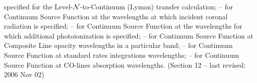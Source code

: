 specified for the Level-${\cal N}$-to-Continuum (Lyman) transfer calculation;
\blankline
{} -- for Continuum Source Function at the wavelengths 
at which incident coronal radiation is specified;
\blankline
{} -- for Continuum Source Function at the wavelengths
for which additional photoionization is specified;
\blankline
{} -- for Continuum Source Function at Composite Line
opacity wavelengths in a particular band;
\blankline
{} -- for Continuum Source Function at standard rates
integrations wavelengths;
\blankline
{} -- for Continuum Source Function at CO-lines absorption
wavelengths.
\blankline
\blankline
\vfill \vfill
\vfill \vfill
\vfill \vfill
\vfill \vfill
\vfill \vfill
\vfill \vfill
\vfill \vfill
\vfill \vfill
\noindent (Section 12 -- last revised: 2006 Nov 02) \par
{}
\ej
